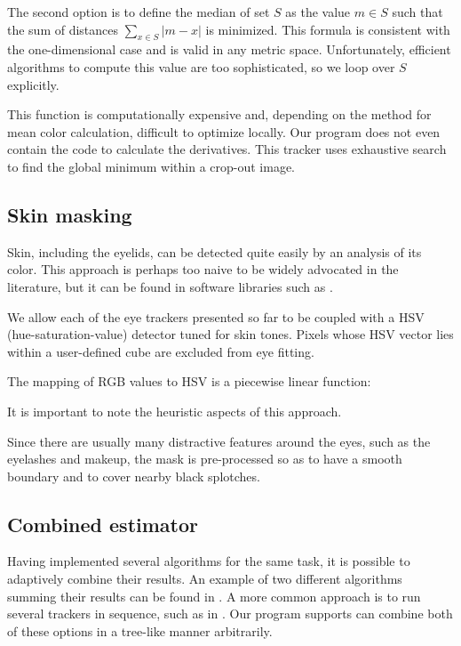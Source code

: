 The second option is to define the median of set $S$ as the value $m \in S$ such that the sum of distances $\sum_{x \in S} |m - x|$ is minimized.
This formula is consistent with the one-dimensional case and is valid in any metric space.
Unfortunately, efficient algorithms to compute this value are too sophisticated, so we loop over $S$ explicitly.

This function is computationally expensive and, depending on the method for mean color calculation, difficult to optimize locally.
Our program does not even contain the code to calculate the derivatives.
This tracker uses exhaustive search to find the global minimum within a crop-out image.

\subsection{Skin masking}

Skin, including the eyelids, can be detected quite easily by an analysis of its color.
This approach is perhaps too naive to be widely advocated in the literature, but it can be found in software libraries such as \cite{deepgaze}.

We allow each of the eye trackers presented so far to be coupled with a HSV (hue-saturation-value) detector tuned for skin tones.
Pixels whose HSV vector lies within a user-defined cube are excluded from eye fitting.

The mapping of RGB values to HSV is a piecewise linear function:

It is important to note the heuristic aspects of this approach.

Since there are usually many distractive features around the eyes, such as the eyelashes and makeup, the mask is pre-processed so as to have a smooth boundary and to cover nearby black splotches.


\subsection{Combined estimator}

Having implemented several algorithms for the same task, it is possible to adaptively combine their results.
An example of two different algorithms summing their results can be found in \cite{leo14}.
A more common approach is to run several trackers in sequence, such as in \cite{wang16,george16,zhu12}.
Our program supports can combine both of these options in a tree-like manner arbitrarily.

